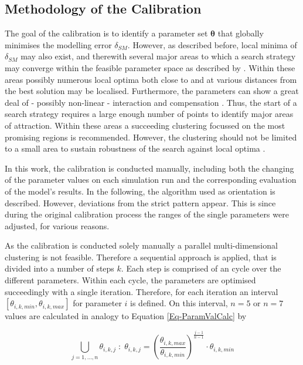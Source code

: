 \subsection{Methodology of the Calibration}
\label{Sec-SubMethCal}

The goal of the calibration is to identify a parameter set $\bm{\theta}$ that globally minimises the modelling error $\delta_{SM}$. 
However, as described before, local minima of $\delta_{SM}$ may also exist, and therewith several major areas to which a search strategy may converge within the feasible parameter space as described by \textcite{Duan.1993}. 
Within these areas possibly numerous local optima both close to and at various distances from the best solution may be localised. 
Furthermore, the parameters can show a great deal of - possibly non-linear - interaction and compensation \parencite{Duan.1993}. 
Thus, the start of a search strategy requires a large enough number of points to identify major areas of attraction. 
Within these areas a succeeding clustering focussed on the most promising regions is recommended. 
However, the clustering should not be limited to a small area to sustain robustness of the search against local optima \parencite{Duan.1993}.

In this work, the calibration is conducted manually, including both the changing of the parameter values on each simulation run and the corresponding evaluation of the model's results. 
In the following, the algorithm used as orientation is described. 
However, deviations from the strict pattern appear. 
This is since during the original calibration process the ranges of the single parameters were adjusted, for various reasons.

As the calibration is conducted solely manually a parallel multi-dimensional clustering is not feasible. 
Therefore a sequential approach is applied, that is divided into a number of steps $k$. 
Each step is comprised of an cycle over the different parameters. 
Within each cycle, the parameters are optimised succeedingly with a single iteration. 
Therefore, for each iteration an interval $[\theta_{i,k,min}, \theta_{i,k,max}]$ for parameter $i$ is defined. 
On this interval, $n=5$ or $n=7$ values are calculated in analogy to Equation \eqref{Eq-ParamValCalc} by

\begin{equation}
    \label{Eq-ParamValCalcCalib}
    \bigcup_{j=1,...,n} \theta_{i,k,j} \; : \; \theta_{i,k,j} = \left( \frac{\theta_{i,k,max}}{\theta_{i,k,min}} \right) ^{\frac{j-1}{n-1}} \cdot \theta_{i,k,min}
\end{equation}

